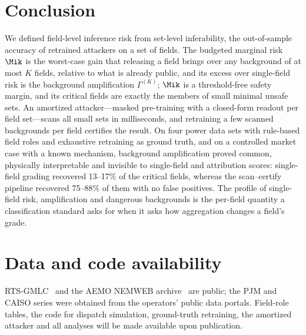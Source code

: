 \section{Conclusion}\label{sec:conclusion}

We defined field-level inference risk from set-level inferability, the out-of-sample accuracy of
retrained attackers on a set of fields. The budgeted marginal risk $\Mik$ is the worst-case gain
that releasing a field brings over any background of at most $K$ fields, relative to what is
already public, and its excess over single-field risk is the background amplification $\Gamma^{(K)}$;
$\Mik$ is a threshold-free safety margin, and its critical fields are exactly the
members of small minimal unsafe sets. An amortized attacker---masked pre-training with a
closed-form readout per field set---scans all small sets in milliseconds, and retraining a few
scanned backgrounds per field certifies the result. On four power data sets with rule-based field
roles and exhaustive retraining as ground truth, and on a controlled market case with a known
mechanism, background amplification proved common, physically interpretable and invisible to
single-field and attribution scores: single-field grading recovered 13--17\% of the critical fields,
whereas the scan--certify pipeline recovered 75--88\% of them with no false positives. The profile of
single-field risk, amplification and dangerous backgrounds is the per-field quantity a
classification standard asks for when it asks how aggregation changes a field's grade.

\section*{Data and code availability}
RTS-GMLC~\cite{barrows2020rts} and the AEMO NEMWEB archive~\cite{aemo2024nemweb} are public; the PJM and CAISO series
were obtained from the operators' public data portals. Field-role tables, the code for dispatch simulation, ground-truth
retraining, the amortized attacker and all analyses will be made available upon publication.
